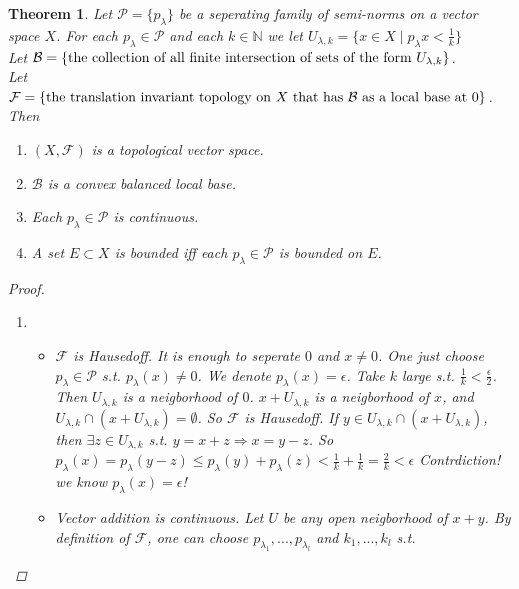 \documentclass{article}
\newtheorem*{theorem}{Theorem}
\begin{document}
\begin{theorem}
    Let $\mathcal{P} = \{p_{\lambda}\}$ be a seperating family of semi-norms on a vector space $X$. 
    For each $p_{\lambda} \in \mathcal{P}$ and each $k \in \mathbb{N}$ we let $U_{\lambda, k} = \{x \in X \mid p_{\lambda}{x} < \frac{1}{k}\}$ \\
    Let $\mathcal{B} = \{ \textnormal{the collection of all finite intersection of sets of the form } U_{\lambda, k}\}$. \\
    Let $\mathcal{F} = \{\textnormal{the translation invariant topology on $X$ that has $\mathcal{B}$ as a local base at $0$}\}$.
    Then
    \begin{enumerate}
        \item $(X, \mathcal{F})$ is a topological vector space.
        \item $\mathcal{B}$ is a convex balanced local base.
        \item Each $p_{\lambda} \in \mathcal{P}$ is continuous.
        \item A set $E \subset X$ is bounded iff each $p_{\lambda} \in \mathcal{P}$ is bounded on $E$.
    \end{enumerate}
    \begin{proof} \hfill
        \begin{enumerate}
            \item 
            \begin{itemize}
                \item $\mathcal{F}$ is Hausedoff. It is enough to seperate $0$ and $x \ne 0$.
                One just choose $p_{\lambda} \in \mathcal{P}$ s.t. $p_{\lambda}(x) \ne 0$.
                We denote $p_{\lambda}(x) = \epsilon$. Take $k$ large s.t. $\frac{1}{k} < \frac{\epsilon}{2}$.
                Then $U_{\lambda, k}$ is a neigborhood of $0$.
                $x + U_{\lambda, k}$ is a neigborhood of $x$, and $U_{\lambda, k} \cap (x + U_{\lambda, k}) = \emptyset$.
                So $\mathcal{F}$ is Hausedoff.
                If $y \in U_{\lambda, k} \cap (x + U_{\lambda, k})$, then $\exists z \in U_{\lambda, k}$ s.t. $y = x + z \Rightarrow x = y - z$.
                So $p_{\lambda}(x) = p_{\lambda}(y - z) \le p_{\lambda}(y) + p_{\lambda}(z) < \frac{1}{k} + \frac{1}{k} = \frac{2}{k} < \epsilon$
                Contrdiction! we know $p_{\lambda}(x) = \epsilon$!
                \item Vector addition is continuous. Let $U$ be any open neigborhood of $x+y$. By definition of $\mathcal{F}$, 
                one can choose $p_{\lambda_1}, ..., p_{\lambda_l}$ and $k_1, ..., k_l$ s.t.

\end{itemize}
\end{enumerate}
\end{proof}
\end{theorem}
\end{document}
